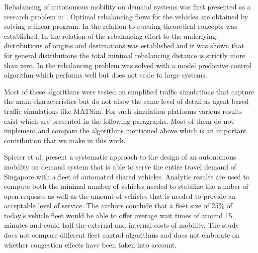Rebalancing of autonomous mobility on demand systems was first presented as a research problem in \citep{pavone2011load}. Optimal rebalancing flows for the vehicles are obtained by solving a linear program. In \citep{zhang2016control} the relation to queuing theoretical concepts was established. In \citep{treleaven2011asymptotically} the relation of the rebalancing effort to the underlying distributions of origins and destinations was established and it was shown that for general distributions the total minimal rebalancing distance is strictly more than zero. In   \citep{zhang2016model} the rebalancing problem was solved with a model predictive control algorithm which performs well but does not scale to large systems. 

Most of these algorithms were tested on simplified traffic simulations that capture the main characteristics but do not allow the same level of detail as agent based traffic simulations like MATSim. For such simulation platforms various results exist which are presented in the following paragraphs. Most of them do not implement and compare the algorithms mentioned above which is an important contribution that we make in this work. 

Spieser et al. \cite{spieser2014toward} present a systematic approach to the design of an autonomous mobility on demand system that is able to serve the entire travel demand of Singapore with a fleet of automated shared vehicles. Analytic results are used to compute both the minimal number of vehicles needed to stabilize the number of open requests as well as the amount of vehicles that is needed to provide an acceptable level of service. The authors conclude that a fleet size of 25\% of today's vehicle fleet would be able to offer average wait times of around 15 minutes and could half the external and internal costs of mobility. The study does not compare different fleet control algorithms and does not elaborate on whether congestion effects have been taken into account.

